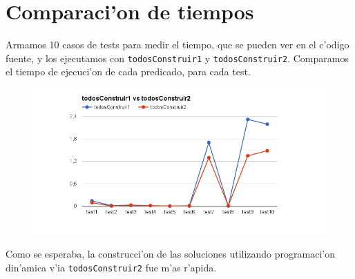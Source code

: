 \documentclass[11pt,a4paper]{article}
\begin{document}
\newpage

\section{Comparaci'on de tiempos}

Armamos 10 casos de tests para medir el tiempo, que se pueden ver en el c'odigo fuente, y los ejecutamos con \texttt{todosConstruir1} y \texttt{todosConstruir2}. Comparamos el tiempo de ejecuci'on de cada predicado, para cada test.

\begin{figure}[H]
    \centering
    \includegraphics[width=7.0in]{imagenes/grafico.png}
    \label{simulationfigure}
\end{figure}

\noindent
Como se esperaba, la construcci'on de las soluciones utilizando programaci'on din'amica v'ia \texttt{todosConstruir2} fue m'as r'apida.
\end{document}
